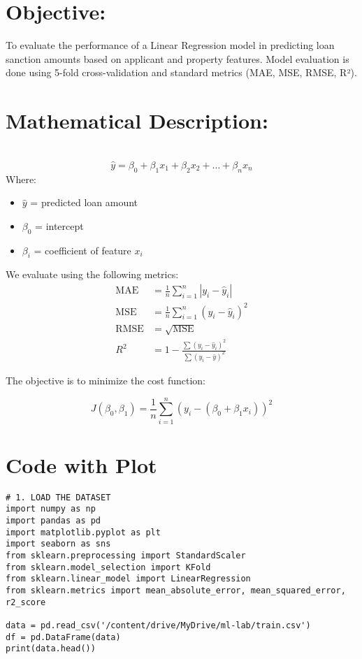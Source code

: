 \documentclass[11pt]{article}
\begin{document}
\noindent
\section{Objective:} 
To evaluate the performance of a Linear Regression model in predicting loan sanction amounts based on applicant and property features. Model evaluation is done using 5-fold cross-validation and standard metrics (MAE, MSE, RMSE, R²).

\vspace{0.2cm}
\noindent
\section{Mathematical Description:} \\
\[
\hat{y} = \beta_0 + \beta_1 x_1 + \beta_2 x_2 + \dots + \beta_n x_n
\]
Where:
\begin{itemize}
    \item $\hat{y}$ = predicted loan amount
    \item $\beta_0$ = intercept
    \item $\beta_i$ = coefficient of feature $x_i$
\end{itemize}

We evaluate using the following metrics:
\begin{align*}
\text{MAE} &= \frac{1}{n} \sum_{i=1}^{n} |y_i - \hat{y}_i| \\
\text{MSE} &= \frac{1}{n} \sum_{i=1}^{n} (y_i - \hat{y}_i)^2 \\
\text{RMSE} &= \sqrt{\text{MSE}} \\
R^2 &= 1 - \frac{\sum (y_i - \hat{y}_i)^2}{\sum (y_i - \bar{y})^2}
\end{align*}

The objective is to minimize the cost function:

\[
J(\beta_0, \beta_1) = \frac{1}{n} \sum_{i=1}^{n} (y_i - (\beta_0 + \beta_1 x_i))^2
\]

\section{Code with Plot}
\begin{verbatim}
# 1. LOAD THE DATASET
import numpy as np
import pandas as pd
import matplotlib.pyplot as plt
import seaborn as sns
from sklearn.preprocessing import StandardScaler
from sklearn.model_selection import KFold
from sklearn.linear_model import LinearRegression
from sklearn.metrics import mean_absolute_error, mean_squared_error, r2_score

data = pd.read_csv('/content/drive/MyDrive/ml-lab/train.csv')
df = pd.DataFrame(data)
print(data.head())
\end{verbatim}
\end{document}
